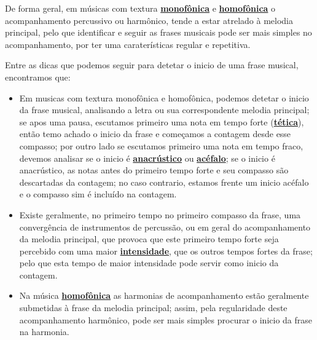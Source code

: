 

De forma geral, em músicas com textura \hyperref[subsec:monofonica]{\textbf{monofônica}} 
e \hyperref[subsec:homofonica]{\textbf{homofônica}} o acompanhamento percussivo ou harmônico,
tende a estar atrelado à melodia principal, 
pelo que identificar e seguir  as frases musicais pode ser mais simples no acompanhamento,
por ter uma caraterísticas regular e repetitiva.


\label{pos:detetandoiniciofrase}
Entre as dicas que podemos seguir para detetar o inicio de uma frase musical, encontramos que:
\begin{itemize}
\item Em musicas com textura monofônica e homofônica, podemos detetar o inicio da frase musical,
analisando a letra ou sua correspondente melodia principal;
se apos uma pausa, escutamos primeiro uma nota em tempo forte (\hyperref[subsub:Tetico]{\textbf{tética}}),
então temo achado o inicio da frase e começamos a contagem desde esse compasso;
por outro lado se escutamos primeiro uma nota em tempo fraco,
devemos analisar se o inicio é \hyperref[subsub:anacrustica]{\textbf{anacrústico}} ou 
\hyperref[subsub:Acefalo]{\textbf{acéfalo}}; 
se o inicio é anacrústico, 
as notas antes do primeiro tempo forte e seu compasso são descartadas da contagem;
no caso contrario, estamos frente um inicio acéfalo e o compasso sim é incluído na contagem. 
\item Existe geralmente, no primeiro tempo no primeiro compasso da frase, 
uma convergência de instrumentos de percussão, ou em geral do acompanhamento da melodia principal,
que provoca que este primeiro tempo forte seja percebido com uma maior \hyperref[sec:pos:Intensidade]{\textbf{intensidade}},
que os outros tempos fortes da frase;
pelo que esta tempo de maior intensidade pode servir como inicio da contagem.
\item Na música \hyperref[subsec:homofonica]{\textbf{homofônica}} as harmonias de acompanhamento estão geralmente submetidas
à frase da melodia principal; assim, pela regularidade deste acompanhamento harmônico,
pode ser mais simples procurar o inicio da frase na harmonia.
\end{itemize}~

